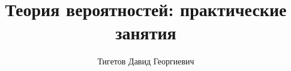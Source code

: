 \documentclass[12pt,a4paper]{report}
\begin{document}
    \title{\textbf{Теория вероятностей}: практические занятия}
    \author{Тигетов Давид Георгиевич}
    \maketitle

    
\end{document}
